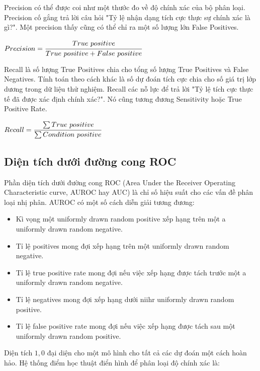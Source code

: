 Precision có thể được coi như một thước đo về độ chính xác của bộ phân loại.
Precision cố gắng trả lời câu hỏi "Tỷ lệ nhận dạng tích cực thực sự chính xác là gì?".
Một precision thấy cũng có thể chỉ ra một số lượng lớn False Positives.

\begin{center}
    ${Precision} =  \cfrac{True\ positive}{True\ positive + False\ positive}$
\end{center}

Recall là số lượng True Positives chia cho tổng số lượng True Positives và False Negatives. Tính toán theo cách khác là số dự đoán tích cực chia cho số giá trị lớp dương trong dữ liệu thử nghiệm. Recall các nỗ lực để trả lời "Tỷ lệ tích cực thực tế đã được xác định chính xác?". Nó cũng tương đương Sensitivity hoặc True Positive Rate.

\begin{center}
    ${Recall} =  \cfrac{\sum True\ positive}{\sum Condition\ positive}$
\end{center}

\subsection{Diện tích dưới đường cong ROC}
\label{ssec:auroc}

Phần diện tích dưới đường cong ROC (Area Under the Receiver Operating Characteristic curve, AUROC hay AUC) là chỉ số hiệu suất cho các vấn đề phân loại nhị phân. AUROC có một số cách diễn giải tương đương:

\begin{itemize}
\item Kì vọng một uniformly drawn random positive xếp hạng trên một  a uniformly drawn random negative.
\item Tỉ lệ positives mong đợi xếp hạng trên một uniformly drawn random negative.
\item Tỉ lệ true positive rate mong đợi nếu việc xếp hạng được tách trước một a uniformly drawn random negative.
\item Tỉ lệ negatives mong đợi xếp hạng dưới niihr uniformly drawn random positive.
\item  Tỉ lệ false positive rate mong đợi nếu việc xếp hạng được tách sau một uniformly drawn random positive.
\end{itemize}

Diện tích $1,0$ đại diện cho một mô hình cho tất cả các dự đoán một cách hoàn hảo. Hệ thống điểm học thuật điển hình để phân loại độ chính xác là:

